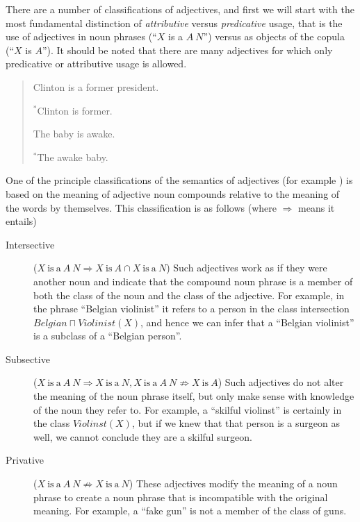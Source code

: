 \documentclass[11pt]{article}
\begin{document}
There are a number of classifications of adjectives, and first we will start 
with the most fundamental distinction of \emph{attributive} versus 
\emph{predicative} usage, that is the use of adjectives in noun phrases 
(``$X$ is a $A~N$'') versus as objects of the copula (``$X$ is $A$''). 
It should be noted that there are many adjectives for which only predicative or 
attributive usage is allowed.

\begin{quote}
	Clinton is a former president.
	
	$^*$Clinton is former.
	
	The baby is awake.
	
	$^*$The awake baby.
\end{quote}

One of the principle classifications of the semantics of adjectives (for example \cite{partee2003there}) is based on the meaning of adjective noun compounds relative to the meaning of the words by themselves. This classification is as follows (where $\Rightarrow$ means it entails)

\begin{description}
\item[Intersective] ($X\mathrm{~is~a~}A~N \Rightarrow X\mathrm{~is~}A \cap X\mathrm{~is~a~}N$) 
Such adjectives work as if they were another noun and indicate that the compound 
noun phrase is a member of both the class of the noun and the class of the 
adjective. For example, in the phrase ``Belgian violinist'' it refers to a 
person in the class intersection $Belgian \sqcap Violinist(X)$, and hence we 
can infer that a ``Belgian violinist'' is a subclass of a ``Belgian person''.
\item[Subsective] ($X\mathrm{~is~a~}A~N \Rightarrow X\mathrm{~is~a~}N, X\mathrm{~is~a~}A~N \not\Rightarrow X\mathrm{~is~}A$) 
Such adjectives do not alter the meaning of the noun phrase itself, but only 
make sense with knowledge of the noun they refer to. For example, a ``skilful 
violinst'' is certainly in the class $Violinst(X)$, but if we knew that that 
person is a surgeon as well, we cannot conclude they are a skilful surgeon. 
\item[Privative] ($X\mathrm{~is~a~}A~N \not\Rightarrow X\mathrm{~is~a~}N$) 
These adjectives modify the meaning of a noun phrase to create a noun phrase 
that is incompatible with the original meaning. For example, a 
``fake gun'' is not a member of the class of guns.
\end{description}
\end{document}
